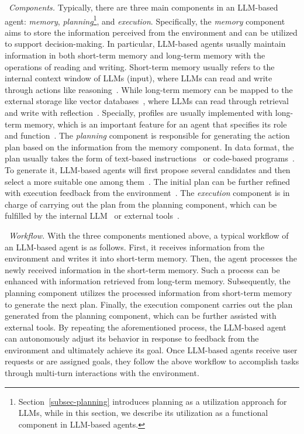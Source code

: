 {\textbullet~\emph{Components.} 
{
Typically, there are three main components in an LLM-based agent: \textit{memory}, \textit{planning}\footnote{
Section~\ref{subsec-planning} introduces planning as a utilization approach for LLMs, while in this section, we describe its utilization as a functional component in LLM-based agents.
}, and \textit{execution}.
Specifically, the \textit{memory} component aims to store the information perceived from the environment and can be utilized to support decision-making.
In particular, LLM-based agents usually maintain information in both short-term memory and long-term memory with the operations of reading and writing.
Short-term memory usually refers to the internal context window of LLMs (\ie input), where LLMs can read and write through actions like reasoning~\cite{Yao-arxiv-2022-ReAct}. 
While long-term memory can be mapped to the external storage like vector databases~\cite{Zhong-2023-arxiv-MemoryBank}, where LLMs can read through retrieval and write with reflection~\cite{Shinn-arxiv-2023-Reflexion}.
Specially, profiles are usually implemented with long-term memory, which is an important feature for an agent that specifies its role and function~\cite{wang-arxiv-2023-a}. 
The \textit{planning} component  %
{is responsible for generating the action plan} based on the information from the memory component.
In data format, the plan usually takes the form of text-based instructions~\cite{Wang-arXiv-2023-Plan} or code-based programs~\cite{Gao-arxiv-2022-PAL}.
To generate it, LLM-based agents will first propose several candidates and then select a more suitable one among  them~\cite{Wang-arxiv-2022-Self-Consistency}.
The initial plan can be further refined with execution feedback from the environment~\cite{Wang-2023-arXiv-voyager}.
The \textit{execution} component is in charge of carrying out the plan from the planning component, 
{which can be fulfilled by  the internal LLM~\cite{Wang-arXiv-2023-Plan} or external tools~\cite{Yao-arxiv-2022-ReAct}.} 
} 

\textbullet~\emph{Workflow.}
{
With the three components mentioned above, a  typical workflow of an LLM-based agent is as follows. 
First, it receives information from the environment and writes it into short-term memory. 
{Then, the agent processes the newly received information in the short-term memory.
Such a process can be enhanced with information retrieved from long-term memory.
Subsequently, the planning component utilizes the processed information from short-term memory to generate the next plan.}
Finally, the execution component carries out the plan generated from the planning component, which can be further assisted with external tools.
By repeating the aforementioned process, the LLM-based agent can autonomously adjust its behavior in response to feedback from the environment and ultimately achieve its goal.
Once LLM-based agents receive user requests or are assigned goals, they follow the above workflow to accomplish tasks through multi-turn interactions with the environment.
}

}
